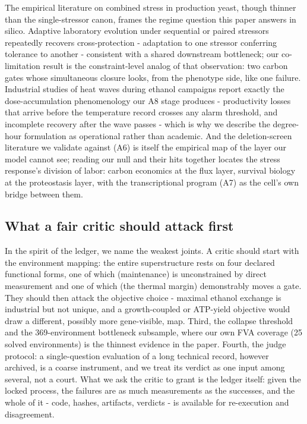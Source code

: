 \documentclass[12pt]{article}
\begin{document}
The empirical literature on combined stress in production yeast, though
thinner than the single-stressor canon, frames the regime question this
paper answers in silico. Adaptive laboratory evolution under sequential
or paired stressors repeatedly recovers cross-protection - adaptation
to one stressor conferring tolerance to another - consistent with a
shared downstream bottleneck; our co-limitation result is the
constraint-level analog of that observation: two carbon gates whose
simultaneous closure looks, from the phenotype side, like one failure.
Industrial studies of heat waves during ethanol campaigns report
exactly the dose-accumulation phenomenology our A8 stage produces -
productivity losses that arrive before the temperature record crosses
any alarm threshold, and incomplete recovery after the wave passes -
which is why we describe the degree-hour formulation as operational
rather than academic. And the deletion-screen literature we validate
against (A6) is itself the empirical map of the layer our model
cannot see; reading our null and their hits together locates the
stress response's division of labor: carbon economics at the flux
layer, survival biology at the proteostasis layer, with the
transcriptional program (A7) as the cell's own bridge between them.

\subsection{What a fair critic should attack first}

In the spirit of the ledger, we name the weakest joints. A critic
should start with the environment mapping: the entire superstructure
rests on four declared functional forms, one of which (maintenance)
is unconstrained by direct measurement and one of which (the thermal
margin) demonstrably moves a gate. They should then attack the
objective choice - maximal ethanol exchange is industrial but not
unique, and a growth-coupled or ATP-yield objective would draw a
different, possibly more gene-visible, map. Third, the collapse
threshold and the 369-environment bottleneck subsample, where our own
FVA coverage (25 solved environments) is the thinnest evidence in the
paper. Fourth, the judge protocol: a single-question evaluation of a
long technical record, however archived, is a coarse instrument, and
we treat its verdict as one input among several, not a court. What we
ask the critic to grant is the ledger itself: given the locked
process, the failures are as much measurements as the successes, and
the whole of it - code, hashes, artifacts, verdicts - is available
for re-execution and disagreement.
\end{document}
